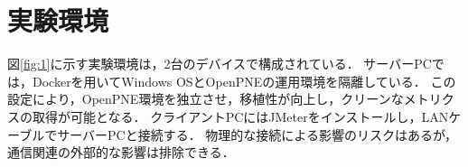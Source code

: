 \documentclass[twoside,twocolumn,10pt]{jarticle}  %
\begin{document}

\section{実験環境}\label{sec:environment}

図\ref{fig:1}に示す実験環境は，2台のデバイスで構成されている．
サーバーPCでは，Dockerを用いてWindows OSとOpenPNEの運用環境を隔離している．
この設定により，OpenPNE環境を独立させ，移植性が向上し，クリーンなメトリクスの取得が可能となる．
クライアントPCにはJMeterをインストールし，LANケーブルでサーバーPCと接続する．
物理的な接続による影響のリスクはあるが，通信関連の外部的な影響は排除できる．
\end{document}
